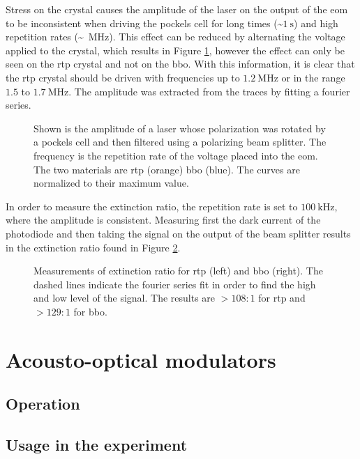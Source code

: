 Stress on the crystal causes the amplitude of the laser on the output of the \ac{eom} to be inconsistent when driving the pockels cell for long times (\~{}$\SI{1}{\second}$) and high repetition rates (\~{}\SI{}{MHz}). This effect can be reduced by alternating the voltage applied to the crystal, which results in Figure \ref{fig:eom_amp_time}, however the effect can only be seen on the \ac{rtp} crystal and not on the \ac{bbo}. With this information, it is clear that the \ac{rtp} crystal should be driven with frequencies up to $\SI{1.2}{\mega \hertz}$ or in the range $1.5$ to $\SI{1.7}{\mega \hertz}$. The amplitude was extracted from the traces by fitting a fourier series.

\begin{figure}[h]
\label{fig:eom_amp_time}
\centering{
	\setlength{\figureheight}{2in}
	\setlength{\figurewidth}{\textwidth}
	
}
\caption{Shown is the amplitude of a laser whose polarization was rotated by a pockels cell and then filtered using a polarizing beam splitter. The frequency is the repetition rate of the voltage placed into the \ac{eom}. The two materials are \ac{rtp} (orange) \ac{bbo} (blue). The curves are normalized to their maximum value.}
\end{figure}

In order to measure the extinction ratio, the repetition rate is set to $\SI{100}{\kilo \hertz}$, where the amplitude is consistent. Measuring first the dark current of the photodiode and then taking the signal on the output of the beam splitter results in the extinction ratio found in Figure \ref{fig:eom_extc}.

\begin{figure}[h]
\label{fig:eom_extc}
\centering{
	\setlength{\figureheight}{2in}
	\setlength{\figurewidth}{\textwidth/2-2.5em}
	
}
\caption{Measurements of extinction ratio for \ac{rtp} (left) and \ac{bbo} (right). The dashed lines indicate the fourier series fit in order to find the high and low level of the signal. The results are $>108:1$ for \ac{rtp} and $>129:1$ for \ac{bbo}.}
\end{figure}


\section{Acousto-optical modulators}
	\subsection{Operation}
	\subsection{Usage in the experiment}

